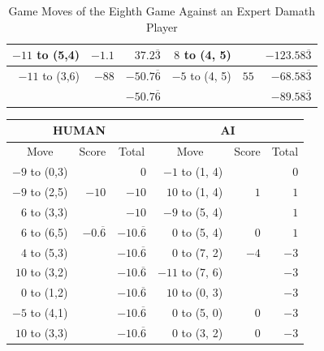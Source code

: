 \begin{appendices}
\begin{table}[H]
\begin{tabular}{rrrrrr}
          $-11$ to (5,4)  & $-1.1$                        &  $37.2\overline3$    &   $8$ to (4, 5) &                            &  $-123.58\overline3$    \\ \hline
          $-11$ to (3,6)  & $-88$                        &  $-50.7\overline6$    &   $-5$ to (4, 5) &            $55$ &  $-68.58\overline3$    \\ \hline \hline
                          &                              &  $-50.7\overline6$    &                  &           &  $-89.58\overline3$    \\ \hline 
    \end{tabular}
    \caption{Game Moves of the Eighth Game Against an Expert Damath Player}
    \label{tab:eighth-game}
\end{table}

\begin{table}[H]
    \centering
    \begin{tabular}{rrrrrr}
        \hline
        \multicolumn{3}{c}{HUMAN}        & \multicolumn{3}{c}{AI}     \\ \hline
        \multicolumn{1}{c}{Move}         & \multicolumn{1}{c}{Score} & \multicolumn{1}{c}{Total} & \multicolumn{1}{c}{Move}         & \multicolumn{1}{c}{Score} & \multicolumn{1}{c}{Total} \\ \hline
          $-9$ to (0,3) &                 &  0    &   $-1$ to (1, 4) &       &  0    \\ \hline
          $-9$ to (2,5) & $-10$           &  $-10$ &   $10$ to (1, 4) & $1$  &  $1$    \\ \hline
          $6$ to (3,3)  &                 &  $-10$ &   $-9$ to (5, 4) &      &  $1$    \\ \hline
          $6$ to (6,5)  & $-0.\overline6$ &  $-10.\overline6$ &   $0$ to (5, 4) & $0$      &  $1$    \\ \hline
          $4$ to (5,3)  &                 &  $-10.\overline6$ &   $0$ to (7, 2) & $-4$      &  $-3$    \\ \hline
          $10$ to (3,2)  &                &  $-10.\overline6$ &   $-11$ to (7, 6) &           &  $-3$    \\ \hline
          $0$ to (1,2)  &                &  $-10.\overline6$ &   $10$ to (0, 3) &           &  $-3$    \\ \hline
          $-5$ to (4,1)  &                &  $-10.\overline6$ &   $0$ to (5, 0) & $0$        &  $-3$    \\ \hline
          $10$ to (3,3)  &                &  $-10.\overline6$ &   $0$ to (3, 2) & $0$        &  $-3$    \\ \hline

\end{tabular}
\end{table}
\end{appendices}
